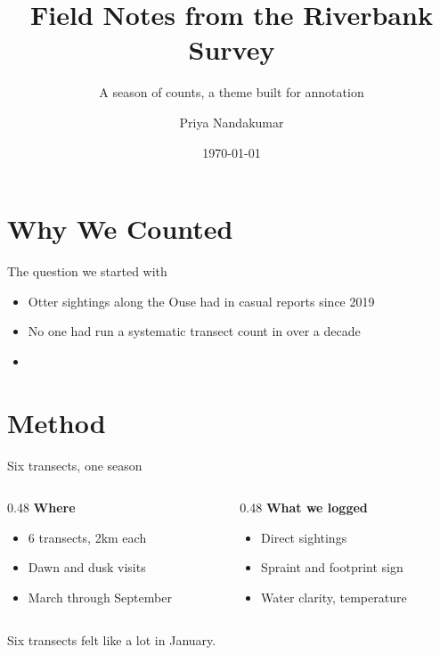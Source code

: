 \documentclass{beamer}
\title{Field Notes from the Riverbank Survey}
\subtitle{A season of counts, a theme built for annotation}
\author{Priya Nandakumar}
\institute{Riverine Ecology Group}
\date{\today}
\begin{document}
\maketitle

\section{Why We Counted}

\begin{frame}{The question we started with}
  \begin{itemize}
    \item Otter sightings along the Ouse had  in casual reports since 2019
    \item No one had run a systematic transect count in over a decade
    \item {}
  \end{itemize}
\end{frame}

\section{Method}

\begin{frame}{Six transects, one season}
  \begin{columns}[T]
    \begin{column}{0.48\textwidth}
      \textbf{Where}
      \begin{itemize}
        \item 6 transects, 2km each
        \item Dawn and dusk visits
        \item March through September
      \end{itemize}
    \end{column}
    \begin{column}{0.48\textwidth}
      \textbf{What we logged}
      \begin{itemize}
        \item Direct sightings
        \item Spraint and footprint sign
        \item Water clarity, temperature
      \end{itemize}
    \end{column}
  \end{columns}
  {\hand Six transects felt like a lot in January.}
\end{frame}
\end{document}
